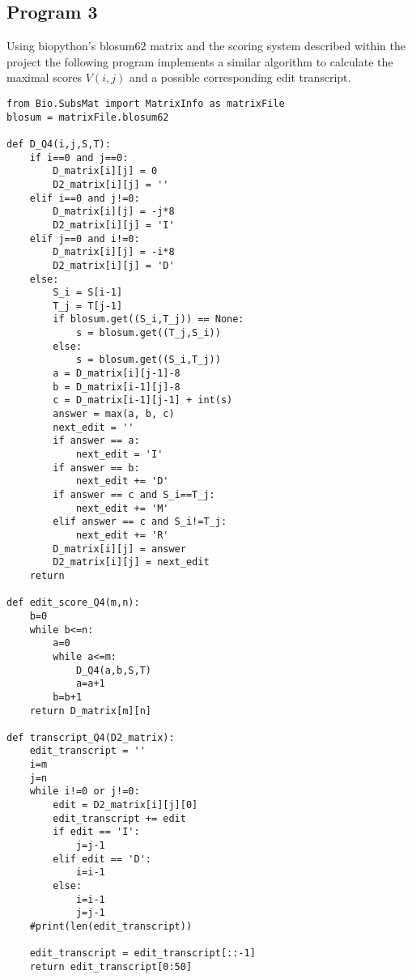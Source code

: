 \documentclass{article}
\begin{document}
\subsection{Program 3}
\vspace{-0.3cm}
\label{subsec:Program 3}
Using biopython's blosum62 matrix and the scoring system described within the project the following program implements a similar algorithm to calculate the maximal scores $V(i,j)$ and a possible corresponding edit transcript.
\begin{lstlisting}
from Bio.SubsMat import MatrixInfo as matrixFile
blosum = matrixFile.blosum62

def D_Q4(i,j,S,T):
    if i==0 and j==0:
        D_matrix[i][j] = 0
        D2_matrix[i][j] = ''
    elif i==0 and j!=0:
        D_matrix[i][j] = -j*8
        D2_matrix[i][j] = 'I'
    elif j==0 and i!=0:
        D_matrix[i][j] = -i*8
        D2_matrix[i][j] = 'D'
    else:
        S_i = S[i-1]
        T_j = T[j-1]
        if blosum.get((S_i,T_j)) == None:
            s = blosum.get((T_j,S_i))
        else:
            s = blosum.get((S_i,T_j))
        a = D_matrix[i][j-1]-8
        b = D_matrix[i-1][j]-8
        c = D_matrix[i-1][j-1] + int(s)
        answer = max(a, b, c)
        next_edit = ''
        if answer == a:
            next_edit = 'I'
        if answer == b:
            next_edit += 'D'
        if answer == c and S_i==T_j:
            next_edit += 'M'
        elif answer == c and S_i!=T_j:
            next_edit += 'R'
        D_matrix[i][j] = answer
        D2_matrix[i][j] = next_edit
    return

def edit_score_Q4(m,n):
    b=0
    while b<=n:
        a=0
        while a<=m:
            D_Q4(a,b,S,T)
            a=a+1
        b=b+1
    return D_matrix[m][n]

def transcript_Q4(D2_matrix):
    edit_transcript = ''
    i=m
    j=n
    while i!=0 or j!=0:
        edit = D2_matrix[i][j][0]
        edit_transcript += edit
        if edit == 'I':
            j=j-1
        elif edit == 'D':
            i=i-1
        else:
            i=i-1
            j=j-1
    #print(len(edit_transcript))

    edit_transcript = edit_transcript[::-1]
    return edit_transcript[0:50]
\end{lstlisting}
\vspace{-0.5cm}
\end{document}
